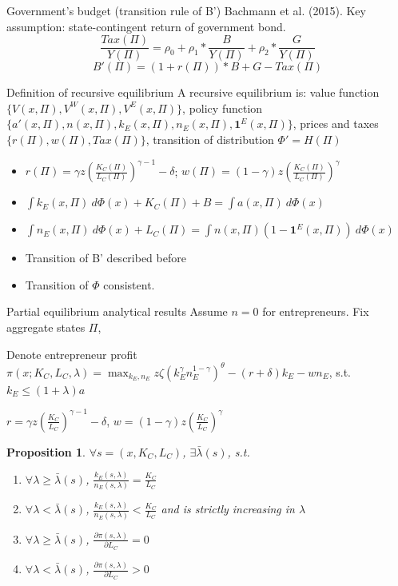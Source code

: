 \documentclass[svgnames]{beamer}
\newtheorem{proposition}[theorem]{Proposition}
\begin{document}
\begin{frame}{Government's budget (transition rule of B')}
Bachmann et al. (2015). Key assumption: state-contingent return of government bond.
$$
\frac{Tax(\Pi)}{Y(\Pi)} = \rho_0 + \rho_1*\frac{B}{Y(\Pi)} +\rho_2*\frac{G}{Y(\Pi)}
$$
$$
B'(\Pi) = (1+r(\Pi))*B + G - Tax(\Pi)
$$
\end{frame}

\begin{frame}{Definition of recursive equilibrium}
A recursive equilibrium is: value function $\{V(x,\Pi), V^W(x,\Pi), V^E(x,\Pi)\}$, policy function $\{a'(x,\Pi),n(x,\Pi),k_E(x,\Pi),n_E(x,\Pi),\mathbf{1}^E(x,\Pi)\}$, prices and taxes $\{r(\Pi),w(\Pi),Tax(\Pi)\}$, transition of distribution $\Phi' = H(\Pi)$
\begin{itemize}
\item $r(\Pi)=\gamma z(\frac{K_C(\Pi)}{L_C(\Pi)})^{\gamma-1}-\delta$;
$w(\Pi)=(1-\gamma) z(\frac{K_C(\Pi)}{L_C(\Pi)})^\gamma$
\item $\int k_E(x,\Pi) \ d\Phi(x) + K_C(\Pi) + B = \int a(x,\Pi) \ d\Phi(x)$
\item $\int n_E(x,\Pi) \ d\Phi(x) + L_C(\Pi) = \int n(x,\Pi)(1-\mathbf{1}^E(x,\Pi)) \ d\Phi(x)$
\item Transition of B' described before
\item Transition of $\Phi$ consistent.
\end{itemize}
\end{frame}

\begin{frame}{Partial equilibrium analytical results}
Assume $n=0$ for entrepreneurs. Fix aggregate states $\Pi$,

Denote entrepreneur profit
$\pi(x;K_C,L_C,\lambda)= \max_{k_E,n_E} z \zeta (k_E^{\gamma}n_E^{1-\gamma})^{\theta} - (r+\delta)k_E- wn_E$, s.t. $k_E \leq (1+\lambda)a$

$r=\gamma z(\frac{K_C}{L_C})^{\gamma-1}-\delta$, $w=(1-\gamma) z(\frac{K_C}{L_C})^\gamma$
\begin{proposition}
$\forall s=(x,K_C,L_C)$, $\exists \bar{\lambda}(s)$, s.t.
\begin{enumerate}
\item $\forall \lambda \geq \bar{\lambda}(s)$, $\frac{k_E(s,\lambda)}{n_E(s,\lambda)}=\frac{K_C}{L_C}$
\item $\forall \lambda < \bar{\lambda}(s)$, $\frac{k_E(s,\lambda)}{n_E(s,\lambda)}<\frac{K_C}{L_C}$ and is strictly increasing in $\lambda$
\item $\forall \lambda \geq \bar{\lambda}(s)$, $\frac{\partial \pi(s,\lambda)}{\partial L_C}=0$
\item $\forall \lambda < \bar{\lambda}(s)$, $\frac{\partial \pi(s,\lambda)}{\partial L_C}>0$
\end{enumerate}
\end{proposition}
\end{frame}
\end{document}
